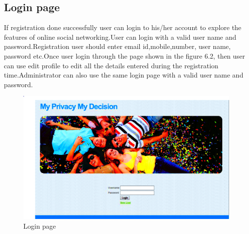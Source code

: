  \subsection[Login Page]{Login page}
If registration done successfully user can login to his/her account to explore the features of online social networking.User can login with a valid user name and password.Registration user should enter email id,mobile,number, user name, password etc.Once user login through the page shown in the figure 6.2, then user can use edit profile to edit all the details entered during the  registration time.Administrator can also use the same login page with a valid user name and password.
\vspace{1cm} 
\vspace{1cm}
\vspace{1cm}
\begin{figure}[H]
\begin{minipage}[c]{1\linewidth}
\begin{center}
 \includegraphics[width=\textwidth]{1.png}
        \caption[Login Page]{Login page}
        \label{Login page}
\end{center}
\end{minipage}  
      \end{figure} 
 \noindent
 \clearpage 
